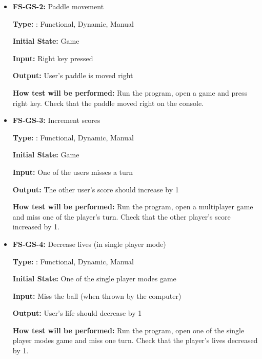\documentclass[12pt,letterpaper]{article}
\begin{document}
\begin{reqbox}
	\begin{itemize}
	\item \textbf{FS-GS-2: }Paddle movement

	\textbf{Type: }: Functional, Dynamic, Manual

	\textbf{Initial State: } Game 

	\textbf{Input: } Right key pressed

	\textbf{Output: }User’s paddle is moved right

	\textbf{How test will be performed: }Run the program, open a game and press right key. Check that the paddle moved right on the console.
	\end{itemize}
\end{reqbox}

\begin{reqbox}
	\begin{itemize}
	\item \textbf{FS-GS-3: }Increment scores

	\textbf{Type: }: Functional, Dynamic, Manual

	\textbf{Initial State: } Game 

	\textbf{Input: } One of the users misses a turn

	\textbf{Output: }The other user’s score should increase by 1

	\textbf{How test will be performed: }Run the program, open a multiplayer game and miss one of the player’s turn. Check that the other player’s score increased by 1.
	\end{itemize}
\end{reqbox}

\begin{reqbox}
	\begin{itemize}
	\item \textbf{FS-GS-4: }Decrease lives (in single player mode)

	\textbf{Type: }: Functional, Dynamic, Manual

	\textbf{Initial State: } One of the single player modes game 

	\textbf{Input: } Miss the ball (when thrown by the computer)

	\textbf{Output: }User’s life should decrease by 1

	\textbf{How test will be performed: }Run the program, open one of the single player modes game and miss one turn. Check that the player’s lives decreased by 1.
	\end{itemize}
\end{reqbox}
\end{document}
